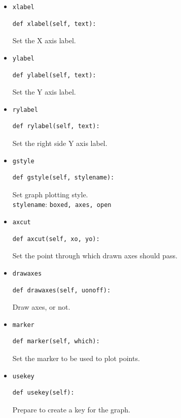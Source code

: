 \documentclass[a4paper,twoside,11pt]{article}
\begin{document}
\begin{itemize}
\item{\texttt{xlabel}}\\
\begin{lstlisting}
def xlabel(self, text):
\end{lstlisting}
Set the X axis label.

\item{\texttt{ylabel}}\\
\begin{lstlisting}
def ylabel(self, text):
\end{lstlisting}
Set the Y axis label.

\item{\texttt{rylabel}}\\
\begin{lstlisting}
def rylabel(self, text):
\end{lstlisting}
Set the right side Y axis label.

\item{\texttt{gstyle}}\\
\begin{lstlisting}
def gstyle(self, stylename):
\end{lstlisting}
  Set graph plotting style.\\
  \texttt{stylename}: \texttt{boxed, axes, open}

\item{\texttt{axcut}}\\
\begin{lstlisting}
def axcut(self, xo, yo):
\end{lstlisting}
Set the point through which drawn axes should pass.

\item{\texttt{drawaxes}}\\
\begin{lstlisting}
def drawaxes(self, uonoff):
\end{lstlisting}
Draw axes, or not.

\item{\texttt{marker}}\\
\begin{lstlisting}
def marker(self, which):
\end{lstlisting}
Set the marker to be used to plot points.

\item{\texttt{usekey}}\\
\begin{lstlisting}
def usekey(self):
\end{lstlisting}
Prepare to create a key for the graph.


\end{itemize}
\end{document}
